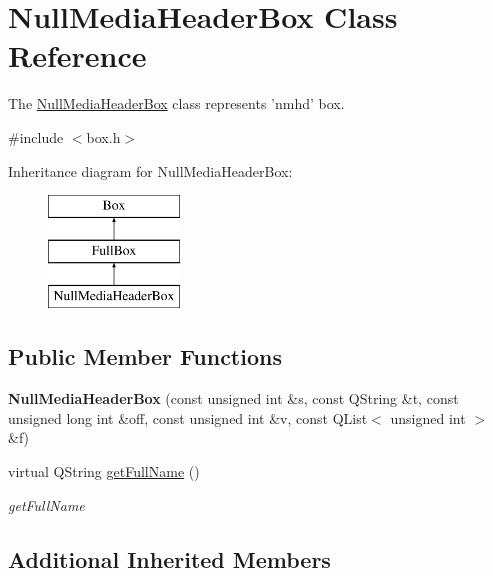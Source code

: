 \hypertarget{class_null_media_header_box}{\section{Null\-Media\-Header\-Box Class Reference}
\label{class_null_media_header_box}
}


The \hyperlink{class_null_media_header_box}{Null\-Media\-Header\-Box} class represents 'nmhd' box.  




{\ttfamily \#include $<$box.\-h$>$}

Inheritance diagram for Null\-Media\-Header\-Box\-:\begin{figure}[H]
\begin{center}
\leavevmode
\includegraphics[height=3.000000cm]{class_null_media_header_box}
\end{center}
\end{figure}
\subsection*{Public Member Functions}
\begin{DoxyCompactItemize}
\item 
\hypertarget{class_null_media_header_box_acef467db61af12f809a73d352bc46982}{{\bfseries Null\-Media\-Header\-Box} (const unsigned int \&s, const Q\-String \&t, const unsigned long int \&off, const unsigned int \&v, const Q\-List$<$ unsigned int $>$ \&f)}\label{class_null_media_header_box_acef467db61af12f809a73d352bc46982}

\item 
virtual Q\-String \hyperlink{class_null_media_header_box_a1d934fede8322ee1eb4b5da2be999411}{get\-Full\-Name} ()
\begin{DoxyCompactList}\small\item\em get\-Full\-Name \end{DoxyCompactList}\end{DoxyCompactItemize}
\subsection*{Additional Inherited Members}


